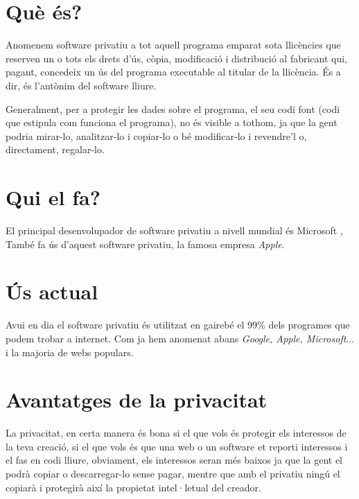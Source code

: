 \section{Què és?}

Anomenem software privatiu a tot aquell programa emparat sota llicències
que reserven un o tots els drets d'ús, còpia, modificació i distribució
al fabricant qui, pagant, concedeix un ús del programa executable al titular
de la llicència. És a dir, és l'antònim del software lliure.

Generalment, per a protegir les dades sobre el programa, el seu codi font
(codi que estipula com funciona el programa), no és visible a tothom, ja 
que la gent podria mirar-lo, analitzar-lo i copiar-lo o bé modificar-lo i
revendre'l o, directament, regalar-lo. \cite{wikipediapropietari}\cite{gnucategories}

\section{Qui el fa?}

El principal desenvolupador de software privatiu a nivell mundial és Microsoft
\cite{gnumicrosoft}, 
També fa ús d'aquest software privatiu, la famosa empresa
\emph{Apple}.

\section{Ús actual}

Avui en dia el software privatiu és utilitzat en gairebé el 99\% dels programes que
podem trobar a internet. Com ja hem anomenat abans \emph{Google, Apple, Microsoft}...
i la majoria de webs populars. \cite{gnumicrosoft}

\section{Avantatges de la privacitat}

La privacitat, en certa manera és bona si el que vols és protegir els interessos de
la teva creació, si el que vols és que una web o un software et reporti interessos 
i el fas en codi lliure, obviament, els interessos seran més baixos ja que la gent 
el podrà copiar o descarregar-lo sense pagar, mentre que amb el privatiu ningú el
copiarà i protegirà així la propietat intel·letual del creador.


